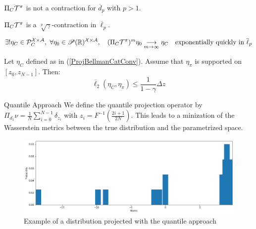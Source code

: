 \documentclass[10pt]{beamer}
\begin{document}
\begin{frame}
    \begin{proposition}
        $\Pi_C\mathcal{T}^\pi$ is not a contraction for $\overline{d}_p$ with $p > 1$.
    \end{proposition}
    \begin{proposition}
        $\Pi_C\mathcal{T}^\pi$ is a $\sqrt[p]\gamma$-contraction in $\overline{\ell}_p$.
    \end{proposition}
    \begin{equation}\label{ProjBellmanCatConv}
        \exists ! \eta_C \in \mathcal{P}_C^{\mathcal{X} \times \mathcal{A}}, \ \forall \eta_0 \in \mathscr{P}(\mathbb{R})^{\mathcal{X} \times \mathcal{A}},\quad (\Pi_C\mathcal{T}^\pi)^m\eta_0 \underset{m \rightarrow \infty}{\longrightarrow} \eta_C \quad \text{exponentially quickly in } \overline{\ell}_p
    \end{equation}
    \begin{lemma}
        Let $\eta_C$ defined as in (\ref{ProjBellmanCatConv}). Assume that $\eta_\pi$ is supported on $[z_0, z_{N-1}]$. Then:
        \[ \overline{\ell}_2(\eta_C, \eta_\pi) \leq \frac{1}{1-\gamma} \Delta z \]
    \end{lemma}
\end{frame}

\begin{frame}{Quantile Approach}
    We define the quantile projection operator by $\displaystyle \Pi_{d_1}\nu = \frac{1}{N} \sum_{i = 0}^{N-1} \delta_{z_i}$ with $\displaystyle z_i = F^{-1}\left(\frac{2i + 1}{2N}\right)$. This leads to a minization of the Wasserstein metrics between the true distribution and the parametrized space.

    \begin{figure}[!ht]
        \centering
        \includegraphics[height=0.4\textheight]{figures/personal_work/quantile.png}
        \caption{Example of a distribution projected with the quantile approach}
    \end{figure}
\end{frame}
\end{document}
